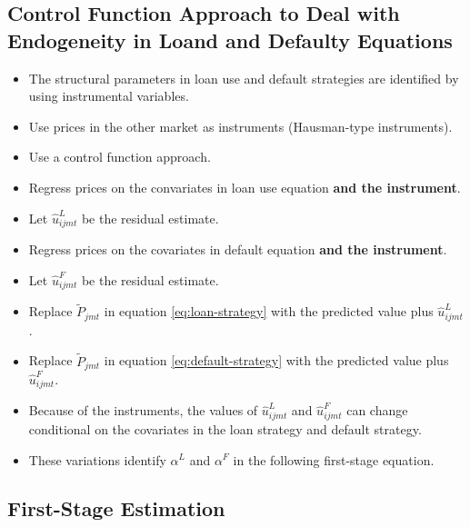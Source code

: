 \documentclass[
]{book}
\providecommand{\tightlist}{%
  \setlength{\itemsep}{0pt}\setlength{\parskip}{0pt}}
\begin{document}
\hypertarget{control-function-approach-to-deal-with-endogeneity-in-loand-and-defaulty-equations}{%
\subsection{Control Function Approach to Deal with Endogeneity in Loand and Defaulty Equations}\label{control-function-approach-to-deal-with-endogeneity-in-loand-and-defaulty-equations}}

\begin{itemize}
\tightlist
\item
  The structural parameters in loan use and default strategies are identified by using instrumental variables.
\item
  Use prices in the other market as instruments (Hausman-type instruments).
\item
  Use a control function approach.
\item
  Regress prices on the convariates in loan use equation \textbf{and the instrument}.
\item
  Let \(\hat{u}_{ijmt}^L\) be the residual estimate.
\item
  Regress prices on the covariates in default equation \textbf{and the instrument}.
\item
  Let \(\hat{u}_{ijmt}^F\) be the residual estimate.
\item
  Replace \(\tilde{P}_{jmt}\) in equation \eqref{eq:loan-strategy} with the predicted value plus \(\hat{u}_{ijmt}^L\).
\item
  Replace \(\tilde{P}_{jmt}\) in equation \eqref{eq:default-strategy} with the predicted value plus \(\hat{u}_{ijmt}^F\).
\item
  Because of the instruments, the values of \(\hat{u}_{ijmt}^L\) and \(\hat{u}_{ijmt}^F\) can change conditional on the covariates in the loan strategy and default strategy.
\item
  These variations identify \(\alpha^L\) and \(\alpha^F\) in the following first-stage equation.
\end{itemize}

\hypertarget{first-stage-estimation}{%
\subsection{First-Stage Estimation}\label{first-stage-estimation}}
\end{document}
